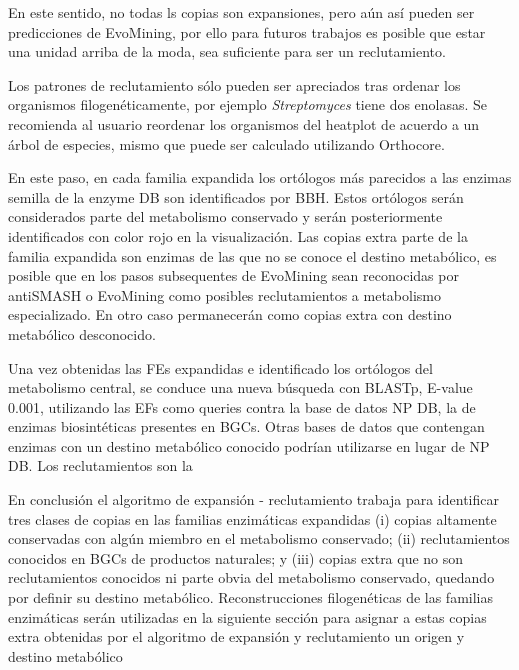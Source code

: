 \documentclass[12pt,twoside]{reedthesis}
\begin{document}
  En este sentido, no todas ls copias son expansiones, pero aún así pueden
  ser predicciones de EvoMining, por ello para futuros trabajos es posible
  que estar una unidad arriba de la moda, sea suficiente para ser un
  reclutamiento.
  
  Los patrones de reclutamiento sólo pueden ser apreciados tras ordenar
  los organismos filogenéticamente, por ejemplo \emph{Streptomyces} tiene
  dos enolasas. Se recomienda al usuario reordenar los organismos del
  heatplot de acuerdo a un árbol de especies, mismo que puede ser
  calculado utilizando Orthocore.
  
  En este paso, en cada familia expandida los ortólogos más parecidos a
  las enzimas semilla de la enzyme DB son identificados por BBH. Estos
  ortólogos serán considerados parte del metabolismo conservado y serán
  posteriormente identificados con color rojo en la visualización. Las
  copias extra parte de la familia expandida son enzimas de las que no se
  conoce el destino metabólico, es posible que en los pasos subsequentes
  de EvoMining sean reconocidas por antiSMASH o EvoMining como posibles
  reclutamientos a metabolismo especializado. En otro caso permanecerán
  como copias extra con destino metabólico desconocido.
  
  Una vez obtenidas las FEs expandidas e identificado los ortólogos del
  metabolismo central, se conduce una nueva búsqueda con BLASTp, E-value
  0.001, utilizando las EFs como queries contra la base de datos NP DB, la
  de enzimas biosintéticas presentes en BGCs. Otras bases de datos que
  contengan enzimas con un destino metabólico conocido podrían utilizarse
  en lugar de NP DB. Los reclutamientos son la
  
  En conclusión el algoritmo de expansión - reclutamiento trabaja para
  identificar tres clases de copias en las familias enzimáticas expandidas
  (i) copias altamente conservadas con algún miembro en el metabolismo
  conservado; (ii) reclutamientos conocidos en BGCs de productos
  naturales; y (iii) copias extra que no son reclutamientos conocidos ni
  parte obvia del metabolismo conservado, quedando por definir su destino
  metabólico. Reconstrucciones filogenéticas de las familias enzimáticas
  serán utilizadas en la siguiente sección para asignar a estas copias
  extra obtenidas por el algoritmo de expansión y reclutamiento un origen
  y destino metabólico
  
\end{document}
